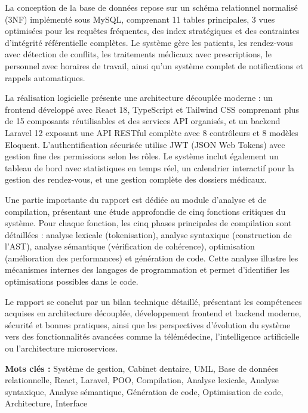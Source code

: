 \documentclass[12pt,a4paper]{report}
\begin{document}
La conception de la base de données repose sur un schéma relationnel normalisé (3NF) implémenté sous MySQL, comprenant 11 tables principales, 3 vues optimisées pour les requêtes fréquentes, des index stratégiques et des contraintes d'intégrité référentielle complètes. Le système gère les patients, les rendez-vous avec détection de conflits, les traitements médicaux avec prescriptions, le personnel avec horaires de travail, ainsi qu'un système complet de notifications et rappels automatiques.

La réalisation logicielle présente une architecture découplée moderne : un frontend développé avec React 18, TypeScript et Tailwind CSS comprenant plus de 15 composants réutilisables et des services API organisés, et un backend Laravel 12 exposant une API RESTful complète avec 8 contrôleurs et 8 modèles Eloquent. L'authentification sécurisée utilise JWT (JSON Web Tokens) avec gestion fine des permissions selon les rôles. Le système inclut également un tableau de bord avec statistiques en temps réel, un calendrier interactif pour la gestion des rendez-vous, et une gestion complète des dossiers médicaux.

Une partie importante du rapport est dédiée au module d'analyse et de compilation, présentant une étude approfondie de cinq fonctions critiques du système. Pour chaque fonction, les cinq phases principales de compilation sont détaillées : analyse lexicale (tokenisation), analyse syntaxique (construction de l'AST), analyse sémantique (vérification de cohérence), optimisation (amélioration des performances) et génération de code. Cette analyse illustre les mécanismes internes des langages de programmation et permet d'identifier les optimisations possibles dans le code.

Le rapport se conclut par un bilan technique détaillé, présentant les compétences acquises en architecture découplée, développement frontend et backend moderne, sécurité et bonnes pratiques, ainsi que les perspectives d'évolution du système vers des fonctionnalités avancées comme la télémédecine, l'intelligence artificielle ou l'architecture microservices.

\vspace{0.5cm}
\textbf{Mots clés :} Système de gestion, Cabinet dentaire, UML, Base de données relationnelle, React, Laravel, POO, Compilation, Analyse lexicale, Analyse syntaxique, Analyse sémantique, Génération de code, Optimisation de code, Architecture, Interface

\newpage
\end{document}
